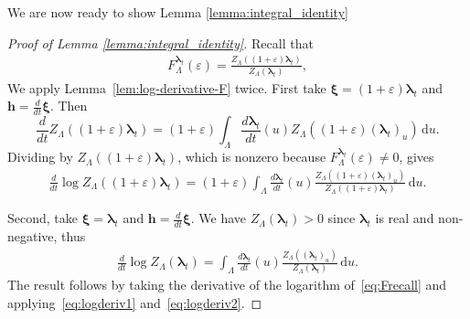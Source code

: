 \documentclass[10pt]{amsart}
\theoremstyle{definition}
\theoremstyle{remark}
\newcommand{\region}{\Lambda}
\newcommand{\activities}{\pmb{\lambda}}
\newcommand{\diff}{\mathrm{d}}
\begin{document}
	
	We are now ready to show Lemma \ref{lemma:integral_identity}
	\begin{proof}[Proof of Lemma \ref{lemma:integral_identity}]
		Recall that
		\begin{align}\label{eq:Frecall}
			F_\region^{\activities_t}(\varepsilon)
			=
			\frac{Z_\region((1+\varepsilon)\activities_t)}
			{Z_\region(\activities_t)} ,
		\end{align}
		We apply Lemma~\ref{lem:log-derivative-F} twice. First take $\pmb{\xi}=(1+\varepsilon)\activities_t$ and $\pmb{h}=\frac{d}{dt} \pmb{\xi}$.
		Then
		\[
		\frac{d}{dt}Z_\region((1+\varepsilon)\activities_t)
		=
		(1+\varepsilon)
		\int_\region
		\frac{d\activities_t}{dt}(u)
		Z_\region((1+\varepsilon)(\activities_t)_u)
		\,\diff u .
		\]
		Dividing by \(Z_\region((1+\varepsilon)\activities_t)\), which is nonzero
		because \(F_\region^{\activities_t}(\varepsilon)\ne0\), gives
		\begin{align}\label{eq:logderiv1}
			\frac{d}{dt}
			\log
			Z_\region((1+\varepsilon)\activities_t)
			=
			(1+\varepsilon)
			\int_\region
			\frac{d\activities_t}{dt}(u)
			\frac{
				Z_\region((1+\varepsilon)(\activities_t)_u)}{
				Z_\region((1+\varepsilon)\activities_t)}
			\,\diff u .
		\end{align}
		
		Second, take $\pmb{\xi}=\activities_t$ and $\pmb{h}=\frac{d}{dt} \pmb{\xi}$.
		We have \(Z_\region(\activities_t)>0\) since $\activities_t$ is real and non-negative, thus
		\begin{align}\label{eq:logderiv2}
			\frac{d}{dt}\log Z_\region(\activities_t)
			=
			\int_\region
			\frac{d\activities_t}{dt}(u)
			\frac{Z_\region((\activities_t)_u)}
			{Z_\region(\activities_t)}
			\,\diff u .
		\end{align}
		The result follows by taking the derivative of the logarithm of~\eqref{eq:Frecall} and applying~\eqref{eq:logderiv1} and~\eqref{eq:logderiv2}.
	\end{proof}
	
	
	
	
	
\end{document}
